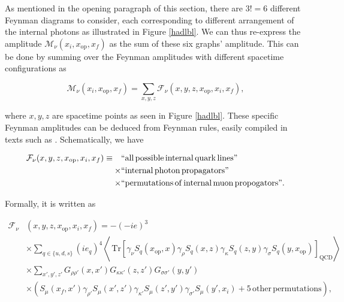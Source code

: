 \documentclass{article}
\numberwithin{equation}{section} %
\begin{document}
As mentioned in the opening paragraph of this section, there are $3!=6$ different Feynman diagrams to consider, each corresponding to different arrangement of the internal photons as illustrated in Figure \ref{hadlbl}. We can thus re-express the amplitude $\mathcal{M}_\nu(x_i,x_\mathrm{op},x_f)$ as the sum of these six graphs' amplitude. This can be done by summing over the Feynman amplitudes with different spacetime configurations as

\begin{equation}
\mathcal{M}_\nu(x_i,x_\mathrm{op},x_f) = \sum_{x,y,z} \mathcal{F}_\nu(x,y,z,x_\mathrm{op},x_i,x_f),
\label{Feynman amplitude}
\end{equation} 

\noindent where $x,y,z$ are spacetime points as seen in Figure \ref{hadlbl}. These specific Feynman amplitudes can be deduced from Feynman rules, easily compiled in texts such as \cite{tong}. Schematically, we have 

\begin{equation}
\begin{split}
\mathcal{F}_\nu(x,y,z,x_\mathrm{op},x_i,x_f) \equiv \quad &\mathrm{``all \, possible} \,  \mathrm{internal \, quark \, lines"} \\
\times &\mathrm{``internal \, photon \, propagators"}\\
\times &\mathrm{``permutations \, of \, internal \, muon \, propogators"}.
\end{split}
\end{equation}

\noindent Formally, it is written as

\begin{equation}
\begin{split}
\mathcal{F}_\nu &(x,y,z,x_\mathrm{op}, x_i, x_f) = -(-ie)^3 \\
& \times \sum_{q\in \{u,d,s\}}(ie_q)^4 \left\langle \, \mathrm{Tr}[\gamma_\nu S_q(x_\mathrm{op},x) \gamma_\rho S_q(x,z) \gamma_\kappa S_q(z,y) \gamma_\sigma S_q(y,x_\mathrm{op})]_\mathrm{QCD} \right\rangle \\
&\times \sum_{x',y',z'} G_{\rho\rho '}(x,x')G_{\kappa\kappa '} (z,z') G_{\sigma\sigma '}(y,y')\\
&\times \left( S_\mu(x_f,x') \gamma_{\rho '} S_\mu(x',z') \gamma_{\kappa '} S_\mu(z',y') \gamma_{\sigma '} S_\mu(y',x_i) + \mathrm{5 \, other \, permutations} \right),
\end{split}
\label{Feynman amplitude full}
\end{equation}
\end{document}
